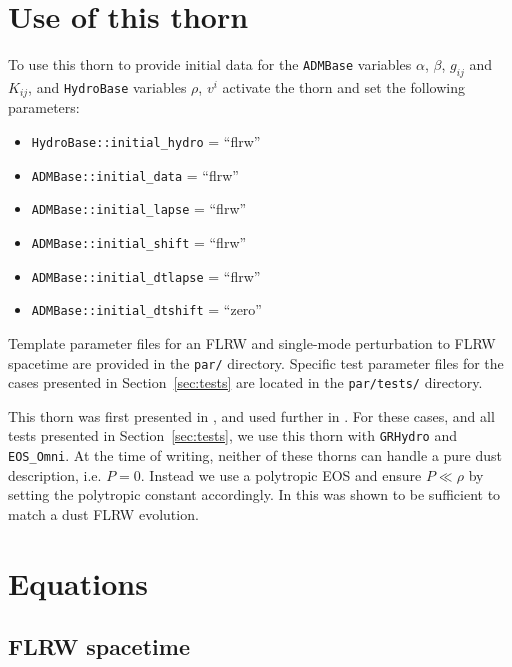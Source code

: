 \section{Use of this thorn}
\label{sec:use}

To use this thorn to provide initial data for the {\tt ADMBase} variables $\alpha$, $\beta$, $g_{ij}$ and $K_{ij}$, and {\tt HydroBase} variables $\rho$, $v^i$ activate the thorn and set the following parameters: 
\begin{itemize}
	\item \texttt{HydroBase::initial\_hydro} = ``flrw''
	\item \texttt{ADMBase::initial\_data} = ``flrw''
	\item \texttt{ADMBase::initial\_lapse} = ``flrw''
	\item \texttt{ADMBase::initial\_shift} = ``flrw''
	\item \texttt{ADMBase::initial\_dtlapse} = ``flrw''
	\item \texttt{ADMBase::initial\_dtshift} = ``zero''
\end{itemize}

Template parameter files for an FLRW and single-mode perturbation to FLRW spacetime are provided in the {\tt par/} directory. Specific test parameter files for the cases presented in Section~\ref{sec:tests} are located in the {\tt par/tests/} directory. 

This thorn was first presented in \cite{macpherson2017}, and used further in \cite{macpherson2019}. For these cases, and all tests presented in Section~\ref{sec:tests}, we use this thorn with {\tt GRHydro} and {\tt EOS\_Omni}. At the time of writing, neither of these thorns can handle a pure dust description, i.e. $P=0$. Instead we use a polytropic EOS and ensure $P\ll\rho$ by setting the polytropic constant accordingly. In \cite{macpherson2017} this was shown to be sufficient to match a dust FLRW evolution. 




\section{Equations}
\label{sec:eqn}

\subsection{FLRW spacetime}

